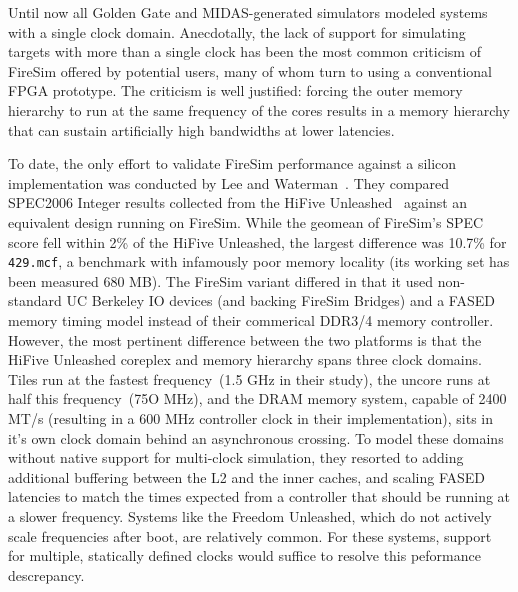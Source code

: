 
Until now all Golden Gate and MIDAS-generated simulators modeled systems with a
single clock domain. Anecdotally, the lack of support for simulating targets
with more than a single clock has been the most common criticism of FireSim
offered by potential users, many of whom turn to using a conventional FPGA
prototype. The criticism is well justified: forcing the outer memory hierarchy
to run at the same frequency of the cores results in a memory hierarchy that
can sustain artificially high bandwidths at lower latencies.

To date, the only effort to validate FireSim performance against a silicon
implementation was conducted by Lee and Waterman~\cite{VLSIFireSimEval}. They
compared SPEC2006 Integer results collected from the HiFive
Unleashed~\cite{HiFiveUnleashed} against an equivalent design running on
FireSim. While the geomean of FireSim's SPEC score fell within 2\% of the
HiFive Unleashed, the largest difference was 10.7\% for \texttt{429.mcf}, a
benchmark with infamously poor memory locality (its working set has been
measured 680 MB\cite{SPEC2006WorkingSet}). The FireSim variant differed in that
it used non-standard UC Berkeley IO devices (and backing FireSim Bridges) and a
FASED memory timing model instead of their commerical DDR3/4 memory controller.
However, the most pertinent difference between the two platforms is that the
HiFive Unleashed coreplex and memory hierarchy spans three clock domains. Tiles
run at the fastest frequency~(1.5 GHz in their study), the uncore runs at half
this frequency~(75O MHz), and the DRAM memory system, capable of 2400 MT/s
(resulting in a 600 MHz controller clock in their implementation), sits in it's
own clock domain behind an asynchronous crossing\cite{FreedomU540}. To model
these domains without native support for multi-clock simulation, they resorted
to adding additional buffering between the L2 and the inner caches, and scaling
FASED latencies to match the times expected from a controller that should be
running at a slower frequency. Systems like the Freedom Unleashed, which do not actively scale frequencies
after boot, are relatively common. For these systems, support for multiple, statically defined clocks
would suffice to resolve this peformance descrepancy.

